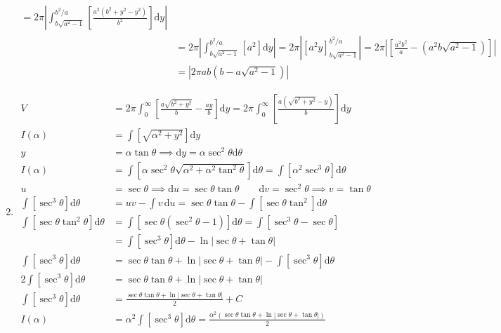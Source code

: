 \documentclass[12pt, A4]{report}
\renewcommand{\d}{\text{d}}
\begin{document}
\begin{enumerate}
\begin{align*}
								= 2\pi\left|\int_{b\sqrt{a^2 - 1}}^{b^2/a}\left[\frac{a^2(b^2 + y^2 - y^2)}{b^2}\right]\d y\right| \\
							&= 2\pi\left|\int_{b\sqrt{a^2 - 1}}^{b^2/a}\left[a^2\right]\d y\right|
								= 2\pi\left|\left[a^2y\right]_{b\sqrt{a^2 - 1}}^{b^2/a}\right| 
								= 2\pi\left|\left[\frac{a^2b^2}{a} - \left(a^2b\sqrt{a^2 - 1}\right)\right]\right| \\
							&= \left|2\pi ab\left(b - a\sqrt{a^2 - 1}\right)\right|
					\end{align*}
				\item
					\begin{align*}
						V &= 2\pi\int_0^{\infty}\left[\frac{a\sqrt{b^2 + y^2}}{b} - \frac{ay}{b}\right]\d y
								= 2\pi\int_0^{\infty}\left[\frac{a\left(\sqrt{b^2 + y^2} - y\right)}{b}\right]\d y \\
						I(\alpha) &= \int\left[\sqrt{\alpha^2 + y^2}\right]\d y \\
						y &= \alpha\tan\theta  \implies \d y = \alpha\sec^2\theta\d\theta\\
						I(\alpha) &= \int\left[\alpha\sec^2\theta\sqrt{\alpha^2 + \alpha^2\tan^2\theta}\right]\d\theta 
								= \int\left[\alpha^2\sec^3\theta\right]\d\theta \\
						u &= \sec\theta 
								\implies \d u = \sec\theta\tan\theta 
								\qquad \d v = \sec^2\theta 
									\implies v = \tan\theta \\
						\int \left[\sec^3\theta\right]\d\theta &= uv - \int v\,\d u
								= \sec\theta\tan\theta - \int\left[\sec\theta\tan^2\right]\d\theta \\
						\int\left[\sec\theta\tan^2\theta\right]\d\theta &= \int\left[\sec\theta\left(\sec^2\theta - 1\right)\right]\d\theta
								= \int\left[\sec^3\theta - \sec\theta\right] \\
								&= \int\left[\sec^3\theta\right]\d\theta - \ln|\sec\theta + \tan\theta| \\
						\int\left[\sec^3\theta\right]\d\theta &= \sec\theta\tan\theta + \ln|\sec\theta + \tan\theta| - \int\left[\sec^3\theta\right]\d\theta \\
						2\int\left[\sec^3\theta\right]\d\theta &= \sec\theta\tan\theta + \ln|\sec\theta + \tan\theta| \\
						\int\left[\sec^3\theta\right]\d\theta &= \frac{\sec\theta\tan\theta + \ln|\sec\theta + \tan\theta|}{2} + C \\
						I(\alpha) &= \alpha^2\int\left[\sec^3\theta\right]\d\theta 
								= \frac{\alpha^2(\sec\theta\tan\theta + \ln|\sec\theta + \tan\theta|)}{2} \\

\end{align*}
\end{enumerate}
\end{document}
